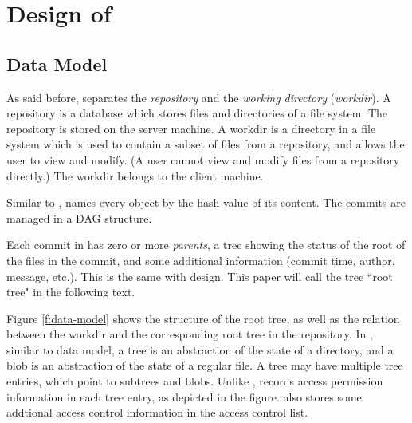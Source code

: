 \section{Design of \sys}
\label{s:design}

%


\subsection{Data Model}
\label{ss:data-model}

As said before, \sys separates the \emph{repository} and the \emph{working
directory} (\emph{workdir}). A repository is a database which stores files
and directories of a file system. The repository is stored on the server
machine. A workdir is a directory in a file system which is used to
contain a subset of files from a repository, and allows the user to view and
modify. (A user cannot view and modify files from a repository directly.) The
workdir belongs to the client machine.

Similar to \git, \sys names every object by the hash value of its content.
The commits are managed in a DAG structure.

Each commit in \sys has zero or more \emph{parents},
a tree showing the status of the root of the files in the commit, and
some additional information (commit time, author, message, etc.). This is the
same with \git design. This paper will call the tree ``root tree" in the
following text.



Figure \ref{f:data-model} shows the structure of the root tree, as well as the
relation between the workdir and the corresponding root tree in the repository.
In \sys, similar to \git data model, a tree is an abstraction of the state
of a directory, and a blob is an abstraction of the state of a regular file. A
tree may have multiple tree entries, which point to subtrees and blobs. Unlike
\git, \sys records access permission information in each tree entry, as depicted
in the figure. \sys also stores some addtional access control information in the
access control list.

